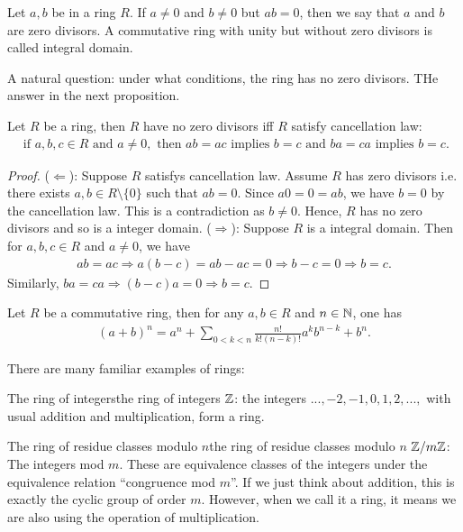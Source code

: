 \begin{definition}{}{}
    Let $a, b$ be in a ring $R$. If $a\neq 0$ and $b\neq0$ but $ab = 0$, then
we say that $a$ and $b$ are zero divisors. A commutative ring with unity but without zero divisors is called integral domain.  
\end{definition}
A natural question: under what conditions, the ring has no zero divisors. THe answer in the next proposition.
\begin{proposition}{}{}
    Let $R$ be a ring, then $R$ have no zero divisors iff
    $R$ satisfy cancellation law:
    \begin{align*}
        \text{ if } a,b,c\in R \text{ and } a\neq 0, \text{ then } ab=ac \text{ implies } b=c \text{ and } ba=ca \text{ implies } b=c.
    \end{align*}
\end{proposition}
\begin{proof}
    ($\Leftarrow$): Suppose $R$ satisfys cancellation law. Assume $R$ has zero divisors i.e. 
    there exists $a,b\in R\setminus \{0\}$ such that $ab=0$. Since $a0=0=ab$, we have $b=0$ by the cancellation law. 
    This is a contradiction as $b\neq 0$. Hence, $R$ has no zero divisors and so is a integer domain.
    ($\Rightarrow$): Suppose $R$ is a integral domain. Then for $a,b,c\in R$ and $a\neq 0$, we have
    \begin{align*}
        ab=ac\Rightarrow a(b-c)=ab-ac=0\Rightarrow b-c=0\Rightarrow b=c.
    \end{align*}
    Similarly, $ba=ca\Rightarrow (b-c)a=0\Rightarrow b=c$.
\end{proof}

\begin{theorem}{}{}
    Let $R$ be a commutative ring, then for any $a,b\in R$ and $n\in\mathbb{N}$, one has
    \begin{align*}
        (a+b)^n = a^n + \sum\limits_{0<k<n}\frac{n!}{k!(n-k)!}a^kb^{n-k} + b^n.
    \end{align*}
\end{theorem}

There are many familiar examples of rings:
\begin{example}{The ring of integers}{the ring of integers}
    $\mathbb{Z}$: the integers $... , -2, -1, 0, 1, 2, ...,$ with usual addition and multiplication, form a ring.
\end{example}

\begin{example}{The ring of residue classes modulo $n$}{the ring of residue classes modulo $n$}
    $\mathbb{Z}/m\mathbb{Z}$: The integers mod $m$. These are equivalence classes of the integers under the equivalence
relation “congruence mod $m$”. If we just think about addition, this is exactly the
cyclic group of order $m$. However, when we call it a ring, it means
we are also using the operation of multiplication.
\end{example}

